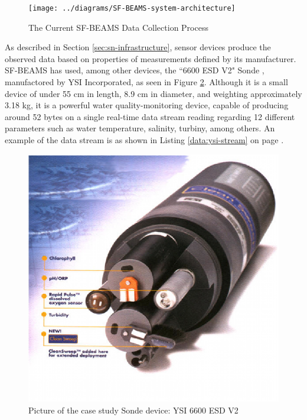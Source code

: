 \begin{figure}[!h]
  \centering
  \texttt{[image: ../diagrams/SF-BEAMS-system-architecture]}
  \caption{The Current SF-BEAMS Data Collection Process}
  \label{fig:SF-BEAMS-system-architecture}
\end{figure}

As described in Section \ref{sec:sn-infrastructure}, sensor devices produce
the observed data based on properties of measurements defined by its
manufacturer. SF-BEAMS has used, among other devices, the ``6600 ESD V2" Sonde
\cite{YSI-Sonde}, manufactored by YSI Incorporated, as seen in Figure
\ref{fig:ysi-device}. Although it is a small device of under 55 cm in length,
8.9 cm in diameter, and weighting approximately 3.18 kg, it is a powerful water
quality-monitoring device, capable of producing around 52 bytes on a single
real-time data stream reading regarding 12 different parameters such as water
temperature, salinity, turbiny, among others. An example of the data stream is
as shown in Listing \ref{data:ysi-stream} on page \pageref{data:ysi-stream}.

\begin{figure}[!h]
  \centering
  \includegraphics[scale=0.7]{../diagrams/ysi-device}
  \caption{Picture of the case study Sonde device: YSI 6600 ESD V2}
  \label{fig:ysi-device}
\end{figure}

